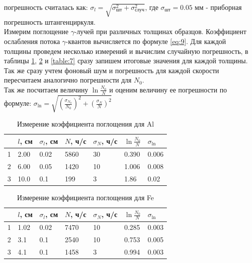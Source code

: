 \documentclass[a4paper,12pt]{article}
\begin{document}
погрешность считалась как: $\sigma_l = \sqrt{\sigma^2_\text{шт} + \sigma^2_\text{случ}}$, где $\sigma_\text{шт} = 0.05$ мм - приборная погрешность штангенциркуля. \\



Измерим поглощение $\gamma$-лучей при различных толщинах образцов. Коэффициент ослабления потока $\gamma$-квантов вычисляется по формуле \eqref{eq:9}. Для каждой толщины проведем несколько измерений и вычислим случайную погрешность, в таблицы \ref{table:5}, \ref{table:6} и \ref{table:7} сразу запишем итоговые значения для каждой толщины.
Так же сразу учтем фоновый шум и погрешность для каждой скорости пересчитаем аналогично погрешности для $N_0$. \\

Так же посчитаем величину $\ln \frac{N_0}{N}$ и оценим величину ее погрешности по формуле: $\sigma_\text{ln} = \sqrt{\left(\frac{\sigma_{N_0}}{N_0}\right)^2 + \left(\frac{\sigma_{N}}{N}\right)^2}$


\FloatBarrier
\begin{table}[!ht]
    \centering
    \begin{tabular}{|l|l|l|l|l|l|l|}
        \hline
          & $l$, см    & $\sigma_l$, см & $N$, ч/с & $\sigma_N$, ч/с & $\ln \frac{N_0}{N}$  & $\sigma_\text{ln}$ \\ \hline
        1 & 2.00 & 0.02     & 5860  & 30    & 0.390 & 0.006      \\ \hline
        2 & 6.00 & 0.05     & 1420  & 10    & 1.006 & 0.008      \\ \hline
        3 & 10.0 & 0.1      & 199   & 3     & 1.86  & 0.02       \\ \hline
    \end{tabular}
    \caption{Измерение коэффициента поглощения для Al}
    \label{table:5}
\end{table}

\begin{table}[!ht]
    \centering
    \begin{tabular}{|l|l|l|l|l|l|l|}
        \hline
          & $l$, см    & $\sigma_l$, см & $N$, ч/с & $\sigma_N$, ч/с & $\ln \frac{N_0}{N}$  & $\sigma_\text{ln}$ \\ \hline
        1 & 1.02 & 0.02     & 7470  & 10    & 0.285 & 0.003      \\ \hline
        2 & 3.1  & 0.1      & 2540  & 10    & 0.753 & 0.005      \\ \hline
        3 & 4.1  & 0.1      & 1458  & 3     & 0.994 & 0.003      \\ \hline
    \end{tabular}
    \caption{Измерение коэффициента поглощения для Fe}
    \label{table:6}
\end{table}
\end{document}
